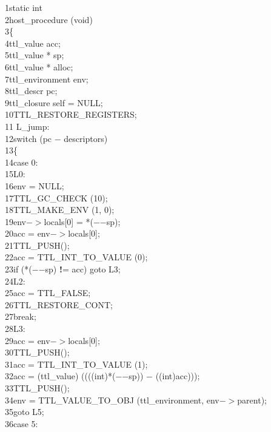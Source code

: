 \begin{Program}
{\scriptsize
\begin{ttlprog}
1\>static int\\
2\>host\_procedure (void)\\
3\>\{\\
4\>\>ttl\_value acc;\\
5\>\>ttl\_value * sp;\\
6\>\>ttl\_value * alloc;\\
7\>\>ttl\_environment env;\\
8\>\>ttl\_descr pc;\\
9\>\>ttl\_closure self = NULL;\\
10\>\>TTL\_RESTORE\_REGISTERS;\\
11\> L\_jump:\\
12\>\>switch (pc $-$ descriptors)\\
13\>\>\>\{\\
14\>\>\>case 0:\\
15\>L0:\\
16\>\>\>\>\>env = NULL;\\
17\>\>\>\>\>TTL\_GC\_CHECK (10);\\
18\>\>\>\>\>TTL\_MAKE\_ENV (1, 0);\\
19\>\>\>\>\>env$-$$>$locals[0] = *($-$$-$sp);\\
20\>\>\>\>\>acc = env$-$$>$locals[0];\\
21\>\>\>\>\>TTL\_PUSH();\\
22\>\>\>\>\>acc = TTL\_INT\_TO\_VALUE (0);\\
23\>\>\>\>\>if (*($-$$-$sp) {\bf!}= acc) goto L3;\\
24\>L2:\\
25\>\>\>\>\>acc = TTL\_FALSE;\\
26\>\>\>\>\>TTL\_RESTORE\_CONT;\\
27\>\>\>\>\>break;\\
28\>L3:\\
29\>\>\>\>\>acc = env$-$$>$locals[0];\\
30\>\>\>\>\>TTL\_PUSH();\\
31\>\>\>\>\>acc = TTL\_INT\_TO\_VALUE (1);\\
32\>\>\>\>\>acc = (ttl\_value) ((((int)*($-$$-$sp)) $-$ ((int)acc)));\\
33\>\>\>\>\>TTL\_PUSH();\\
34\>\>\>\>\>env = TTL\_VALUE\_TO\_OBJ (ttl\_environment, env$-$$>$parent);\\
35\>\>\>\>\>goto L5;\\
36\>\>\>case 5:\\
$$
\end{ttlprog}}
\end{Program}
